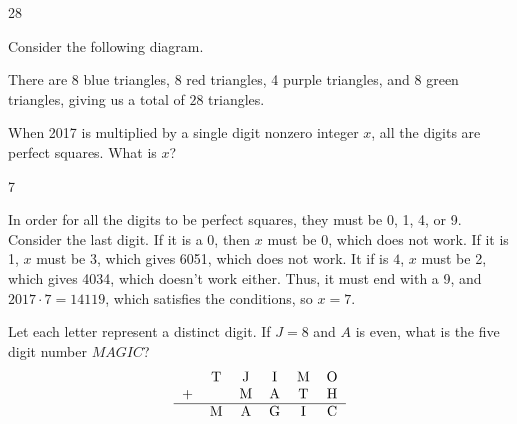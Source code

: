 \documentclass[11pt]{article}
\begin{document}
\begin{answer}
28
\end{answer}

\begin{solution}
Consider the following diagram.
\begin{center}
    \end{center}
There are 8 blue triangles, 8 red triangles, 4 purple triangles, and 8 green triangles, giving us a total of $\boxed{28}$ triangles.

\end{solution}

\begin{problem}
When 2017 is multiplied by a single digit nonzero integer $x$, all the digits are perfect squares. What is $x$?
\end{problem}

\begin{answer}
7
\end{answer}

\begin{solution}
In order for all the digits to be perfect squares, they must be 0, 1, 4, or 9. Consider the last digit. If it is a 0, then $x$ must be 0, which does not work. If it is 1, $x$ must be 3, which gives 6051, which does not work. It if is $4$, $x$ must be 2, which gives 4034, which doesn't work either. Thus, it must end with a 9, and $2017\cdot7=14119$, which satisfies the conditions, so $x=\boxed{7}$.
\end{solution}

\begin{problem}
Let each letter represent a distinct digit. If $J=8$ and $A$ is even, what is the five digit number $MAGIC$?
\[
    \begin{tabular}{c c c c c c}
        & T & J & I & M & O \\
        + & & M & A & T & H \\
        \hline
        & M & A & G & I & C
    \end{tabular}
\]
\end{problem}
\end{document}
